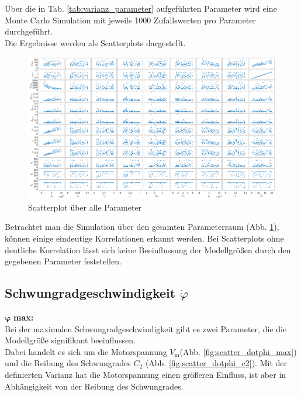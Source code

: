 Über die in Tab. \ref{tab:varianz_parameter} aufgeführten Parameter wird eine Monte Carlo Simulation mit jeweils 1000 Zufallswerten pro Parameter durchgeführt.\\
Die Ergebnisse werden als Scatterplots dargestellt.\\

\begin{figure}
    \centering
    \includegraphics[width=\textwidth]{Bilder/5_sensi/cm/scatter.eps}
    \caption{Scatterplot über alle Parameter}
    \label{fig:scatter}
\end{figure}
Betrachtet man die Simulation über den gesamten Parameterraum (Abb. \ref{fig:scatter}), können einige eindeutige Korrelationen erkannt werden.
Bei Scatterplots ohne deutliche Korrelation lässt sich keine Beeinflussung der Modellgrößen durch den gegebenen Parameter feststellen.

\subsection*{Schwungradgeschwindigkeit $\dot\varphi$}
$\bm{\dot\varphi}$ \textbf{max: }\\
Bei der maximalen Schwungradgeschwindigkeit gibt es zwei Parameter, die die Modellgröße signifikant beeinflussen.\\
Dabei handelt es sich um die Motorspannung $V_{\mathrm{m}}$(Abb. \ref{fig:scatter_dotphi_max}) und die Reibung des Schwungrades $C_2$ (Abb. \ref{fig:scatter_dotphi_c2}).
Mit der definierten Varianz hat die Motorspannung einen größeren Einfluss, ist aber in Abhängigkeit von der Reibung des Schwungrades.\\

